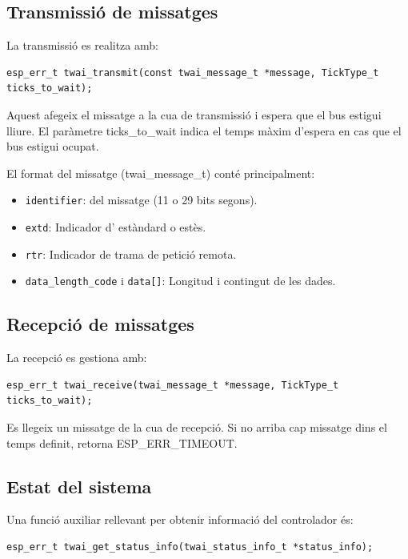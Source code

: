 \documentclass{tfgitic}[2024/07/01]
\begin{document}
\subsection{Transmissió de missatges}

La transmissió es realitza amb:

\begin{verbatim}
esp_err_t twai_transmit(const twai_message_t *message, TickType_t ticks_to_wait);
\end{verbatim}

Aquest afegeix el missatge a la cua de transmissió i espera que el bus estigui lliure. El paràmetre ticks\_to\_wait indica el temps 
màxim d'espera en cas que el bus estigui ocupat.

El format del missatge (twai\_message\_t) conté principalment:

\begin{itemize}
    \item \texttt{identifier}:  del missatge (11 o 29 bits segons).
    \item \texttt{extd}: Indicador d' estàndard o estès.
    \item \texttt{rtr}: Indicador de trama de petició remota.
    \item \texttt{data\_length\_code} i \texttt{data[]}: Longitud i contingut de les dades.
\end{itemize}

\subsection{Recepció de missatges}

La recepció es gestiona amb:
\begin{verbatim}
esp_err_t twai_receive(twai_message_t *message, TickType_t ticks_to_wait);
\end{verbatim}

Es llegeix un missatge de la cua de recepció. Si no arriba cap missatge dins el temps definit, retorna ESP\_ERR\_TIMEOUT.

\subsection{Estat del sistema}

Una funció auxiliar rellevant per obtenir informació del controlador és:
\begin{verbatim}
esp_err_t twai_get_status_info(twai_status_info_t *status_info);
\end{verbatim}
\end{document}

